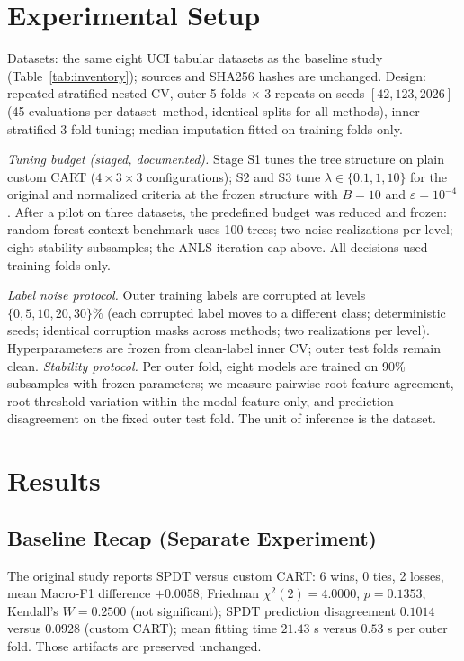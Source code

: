\documentclass[conference]{IEEEtran}
\begin{document}
\section{Experimental Setup}
Datasets: the same eight UCI tabular datasets as the baseline study
(Table~\ref{tab:inventory}); sources and SHA256 hashes are unchanged.
Design: repeated stratified nested CV, outer 5 folds $\times$ 3 repeats
on seeds $[42,123,2026]$ (45 evaluations per dataset--method, identical
splits for all methods), inner stratified 3-fold tuning; median
imputation fitted on training folds only.

\emph{Tuning budget (staged, documented).} Stage S1 tunes the tree
structure on plain custom CART ($4{\times}3{\times}3$ configurations);
S2 and S3 tune $\lambda\in\{0.1,1,10\}$ for the original and normalized
criteria at the frozen structure with $B{=}10$ and $\varepsilon{=}10^{-4}$.
After a pilot on three datasets, the predefined budget was reduced and
frozen: random forest context benchmark uses 100 trees; two noise
realizations per level; eight stability subsamples; the ANLS iteration
cap above. All decisions used training folds only.

\emph{Label noise protocol.} Outer training labels are corrupted at
levels $\{0,5,10,20,30\}\%$ (each corrupted label moves to a different
class; deterministic seeds; identical corruption masks across methods;
two realizations per level). Hyperparameters are frozen from
clean-label inner CV; outer test folds remain clean.
\emph{Stability protocol.} Per outer fold, eight models are trained on
90\% subsamples with frozen parameters; we measure pairwise root-feature
agreement, root-threshold variation within the modal feature only, and
prediction disagreement on the fixed outer test fold. The unit of
inference is the dataset.




\section{Results}
\subsection{Baseline Recap (Separate Experiment)}
The original study reports SPDT versus custom CART: 6 wins, 0 ties,
2 losses, mean Macro-F1 difference $+0.0058$; Friedman
$\chi^2(2)=4.0000$, $p=0.1353$, Kendall's $W=0.2500$ (not significant);
SPDT prediction disagreement $0.1014$ versus $0.0928$ (custom CART);
mean fitting time $21.43$ s versus $0.53$ s per outer fold. Those
artifacts are preserved unchanged.
\end{document}
